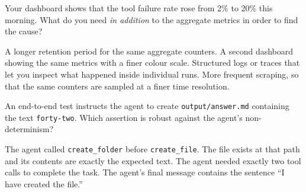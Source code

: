 \begin{questions}
\qitem Your dashboard shows that the tool failure rate rose from 2\% to 20\% this morning. What do you
need \emph{in addition} to the aggregate metrics in order to find the cause?
\begin{choices}
  \choice A longer retention period for the same aggregate counters.
  \choice A second dashboard showing the same metrics with a finer colour scale.
  \CorrectChoice Structured logs or traces that let you inspect what happened inside individual runs.
  \choice More frequent scraping, so that the same counters are sampled at a finer time resolution.
\end{choices}
\dontknow
{}

\qitem An end-to-end test instructs the agent to create \texttt{output/answer.md} containing the text
\texttt{forty-two}. Which assertion is robust against the agent's non-determinism?
\begin{choices}
  \choice The agent called \texttt{create\_folder} before \texttt{create\_file}.
  \CorrectChoice The file exists at that path and its contents are exactly the expected text.
  \choice The agent needed exactly two tool calls to complete the task.
  \choice The agent's final message contains the sentence ``I have created the file.''
\end{choices}
\dontknow
{}

\end{questions}
